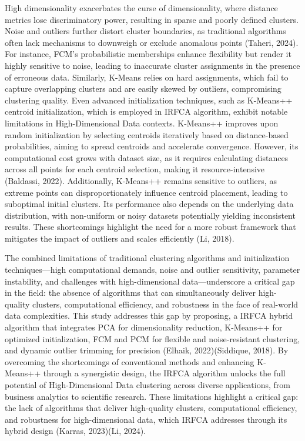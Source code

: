 \documentclass[twoside,11pt]{article}
\begin{document}
High dimensionality exacerbates the curse of dimensionality, where distance metrics lose discriminatory power, resulting in sparse and poorly defined clusters. Noise and outliers further distort cluster boundaries, as traditional algorithms often lack mechanisms to downweigh or exclude anomalous points (Taheri, 2024). For instance, FCM’s probabilistic memberships enhance flexibility but render it highly sensitive to noise, leading to inaccurate cluster assignments in the presence of erroneous data. Similarly, K-Means relies on hard assignments, which fail to capture overlapping clusters and are easily skewed by outliers, compromising clustering quality.
Even advanced initialization techniques, such as K-Means++ centroid initialization, which is employed in IRFCA algorithm, exhibit notable limitations in High-Dimensional Data contexts. K-Means++ improves upon random initialization by selecting centroids iteratively based on distance-based probabilities, aiming to spread centroids and accelerate convergence. However, its computational cost grows with dataset size, as it requires calculating distances across all points for each centroid selection, making it resource-intensive (Baldassi, 2022). Additionally, K-Means++ remains sensitive to outliers, as extreme points can disproportionately influence centroid placement, leading to suboptimal initial clusters. Its performance also depends on the underlying data distribution, with non-uniform or noisy datasets potentially yielding inconsistent results. These shortcomings highlight the need for a more robust framework that mitigates the impact of outliers and scales efficiently (Li, 2018).

The combined limitations of traditional clustering algorithms and initialization techniques—high computational demands, noise and outlier sensitivity, parameter instability, and challenges with high-dimensional data—underscore a critical gap in the field: the absence of algorithms that can simultaneously deliver high-quality clusters, computational efficiency, and robustness in the face of real-world data complexities. This study addresses this gap by proposing, a IRFCA hybrid algorithm that integrates PCA for dimensionality reduction, K-Means++ for optimized initialization, FCM and PCM for flexible and noise-resistant clustering, and dynamic outlier trimming for precision (Elhaik, 2022)(Siddique, 2018). By overcoming the shortcomings of conventional methods and enhancing K-Means++ through a synergistic design, the IRFCA algorithm unlocks the full potential of High-Dimensional Data clustering across diverse applications, from business analytics to scientific research. These limitations highlight a critical gap: the lack of algorithms that deliver high-quality clusters, computational efficiency, and robustness for high-dimensional data, which IRFCA addresses through its hybrid design \cite{Ravuri, 2020}(Karras, 2023)(Li, 2024).
\end{document}
